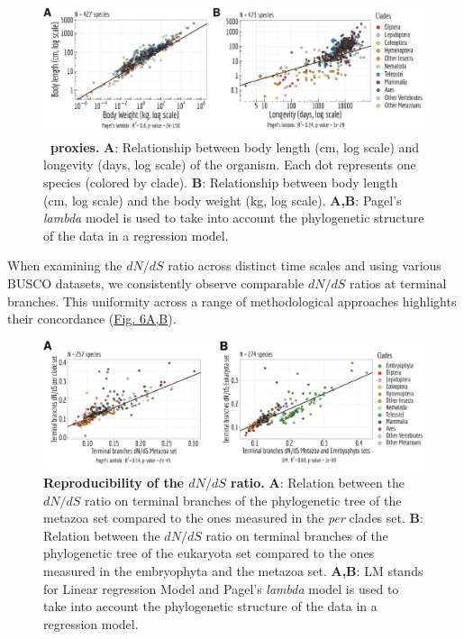 \begin{figure}[t]  
         \centering
        \includegraphics[width=\textwidth]{Figure5.pdf}
                                                                           
    \caption[\Ne~proxies]{\textbf{\Ne~proxies.} \textbf{A}: Relationship between body length (cm, log scale) and longevity (days, log scale) of the organism. Each dot represents one species (colored by clade). \textbf{B}: Relationship between body length (cm, log scale) and the body weight (kg, log scale). \textbf{A,B}: Pagel's \textit{lambda} model is used to take into account the phylogenetic structure of the data in a regression model.\newline}
    \label{fig:gtdrift5}
\end{figure}

When examining the ${dN}/{dS}$ ratio across distinct time scales and using various \acrshort{BUSCO} datasets, we consistently observe comparable ${dN}/{dS}$ ratios at terminal branches. This uniformity across a range of methodological approaches highlights their concordance (\hyperref[fig:gtdrift6]{Fig. 6A,B}). 

\begin{figure}[t]   
         \centering
        \includegraphics[width=\textwidth]{Figure6.pdf}
                                                                           
    \caption[Reproducibility of the ${dN}/{dS}$ ratio]{\textbf{Reproducibility of the ${dN}/{dS}$ ratio.} \textbf{A}: Relation between the ${dN}/{dS}$ ratio on terminal branches of the phylogenetic tree of the metazoa set compared to the ones measured in the \textit{per} clades set. \textbf{B}: Relation between the ${dN}/{dS}$ ratio on terminal branches of the phylogenetic tree of the eukaryota set compared to the ones measured in the embryophyta and the metazoa set. \textbf{A,B}: LM stands for Linear regression Model and Pagel's \textit{lambda} model is used to take into account the phylogenetic structure of the data in a regression model.\newline}
    \label{fig:gtdrift6}
\end{figure}

